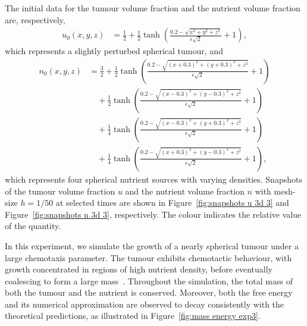 \documentclass[11pt, reqno]{amsart}
\theoremstyle{definition}
\numberwithin{equation}{section}
\begin{document}
The initial data for the tumour volume fraction and the nutrient volume fraction are, respectively,
\begin{align*}
    u_0(x,y,z)
    &=
    \frac12 + \frac12 \tanh\left(\frac{0.2-\sqrt{x^2+y^2+z^2}}{\epsilon\sqrt{2}} + 1\right),
\end{align*}
which represents a slightly perturbed spherical tumour, and
\begin{align*}
    n_0(x,y,z)
    &=
    \frac32 + \frac12 \tanh\left(\frac{0.2-\sqrt{(x+0.3)^2+(y+0.3)^2+z^2}}{\epsilon\sqrt{2}} + 1\right)
    \\
    &\quad
    +
    \frac12 \tanh\left(\frac{0.2-\sqrt{(x-0.3)^2+(y-0.3)^2+z^2}}{\epsilon\sqrt{2}} + 1\right)
    \\
    &\quad
    +
    \frac14 \tanh\left(\frac{0.2-\sqrt{(x-0.3)^2+(y+0.3)^2+z^2}}{\epsilon\sqrt{2}} + 1\right)
    \\
    &\quad
    +
    \frac14 \tanh\left(\frac{0.2-\sqrt{(x+0.3)^2+(y-0.3)^2+z^2}}{\epsilon\sqrt{2}} + 1\right),
\end{align*}
which represents four spherical nutrient sources with varying densities. Snapshots of the tumour volume fraction $u$ and the nutrient volume fraction $n$ with mesh-size $h=1/50$ at selected times are shown in Figure~\ref{fig:snapshots u 3d 3} and Figure~\ref{fig:snapshots n 3d 3}, respectively. The colour indicates the relative value of the quantity. 

In this experiment, we simulate the growth of a nearly spherical tumour under a large chemotaxis parameter. The tumour exhibits chemotactic behaviour, with growth concentrated in regions of high nutrient density, before eventually coalescing to form a large mass~\cite{PulSimSea15}. Throughout the simulation, the total mass of both the tumour and the nutrient is conserved. Moreover, both the free energy and its numerical approximation are observed to decay consistently with the theoretical predictions, as illustrated in Figure~\ref{fig:mass energy exp3}.
\end{document}
